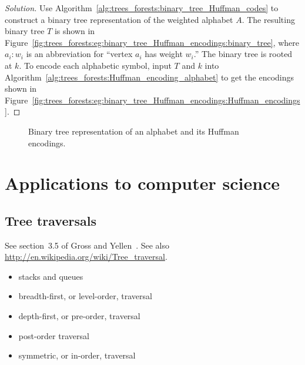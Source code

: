 \begin{proof}[Solution]
Use Algorithm~\ref{alg:trees_forests:binary_tree_Huffman_codes} to
construct a binary tree representation of the weighted alphabet
$A$. The resulting binary tree $T$ is shown in
Figure~\ref{fig:trees_forests:eg:binary_tree_Huffman_encodings:binary_tree},
where $a_i: w_i$ is an abbreviation for ``vertex $a_i$ has weight
$w_i$.'' The binary tree is rooted at $k$. To encode each alphabetic
symbol, input $T$ and $k$ into
Algorithm~\ref{alg:trees_forests:Huffman_encoding_alphabet} to get the
encodings shown in
Figure~\ref{fig:trees_forests:eg:binary_tree_Huffman_encodings:Huffman_encodings}.
\end{proof}

\begin{figure}[!htbp]
\centering

\caption{Binary tree representation of an alphabet and its Huffman encodings.}
\label{fig:trees_forests:eg:binary_tree_Huffman_encodings}
\end{figure}



\section{Applications to computer science}



\subsection{Tree traversals}

See section~3.5 of Gross and Yellen~\cite{GrossYellen1999}.
See also \url{http://en.wikipedia.org/wiki/Tree_traversal}.

\begin{itemize}
\item stacks and queues

\item breadth-first, or level-order, traversal

\item depth-first, or pre-order, traversal

\item post-order traversal

\item symmetric, or in-order, traversal
\end{itemize}

